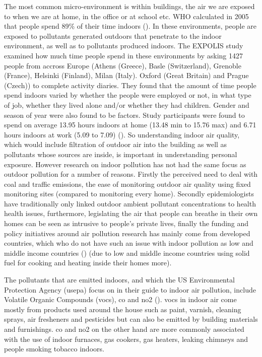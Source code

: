 The most common micro-environment is within buildings, the air we are exposed to when we are at home, in the office or at school etc. WHO calculated in 2005 that people spend 89\% of their time indoors (\cite{WorldHealthOrganization2005}). In these environments, people are exposed to pollutants generated outdoors that penetrate to the indoor environment, as well as to pollutants produced indoors. The EXPOLIS study \cite{Kousa2002} examined how much time people spend in these environments by asking 1427 people from accross Europe (Athens (Greece), Basle (Switzerland), Grenoble (France), Helsinki (Finland), Milan (Italy). Oxford (Great Britain) and Prague (Czech)) to complete activity diaries. They found that the amount of time people spend indoors varied by whether the people were employed or not, in what type of job, whether they lived alone and/or whether they had children. Gender and season of year were also found to be factors. Study participants were found to spend on average 13.95 hours indoors at home (13.48 min to 15.76 max) and 6.71 hours indoors at work (5.09 to 7.09) (\cite{Schweizer2007}). So understanding indoor air quality, which would include filtration of outdoor air into the building as well as pollutants whose sources are inside, is important in understanding personal exposure. However research on indoor pollution has not had the same focus as outdoor pollution for a number of reasons. Firstly the perceived need to deal with coal and traffic emissions, the ease of monitoring outdoor air quality using fixed monitoring sites (compared to monitoring every home). Secondly epidemiologists have traditionally only linked outdoor ambient pollutant concentrations to health health issues, furthermore, legislating the air that people can breathe in their own homes can be seen as intrusive to people's private lives, finally  the funding and policy initiatives around air pollution research has mainly come from developed countries, which who do not have such an issue with indoor pollution as low and middle income countries (\cite{WorldHealthOrganization2010}) (due to low and middle income countries using solid fuel for cooking and heating inside their homes more).

The pollutants that are emitted indoors, and which the US Environmental Protection Agency (\gls{usepa}) focus on in their guide to indoor air pollution, include Volatile Organic Compounds (\gls{vocs}), \gls{co} and \gls{no2} (\cite{UnitedStatesEnvironmentalProtectionAgency2008}). \gls{vocs} in indoor air come mostly from products used around the house such as paint, varnish, cleaning sprays, air fresheners and pesticides but can also be emitted by building materials and furnishings. \gls{co} and \gls{no2} on the other hand are more commonly associated with the use of indoor furnaces, gas cookers, gas heaters, leaking chimneys and people smoking tobacco indoors.

